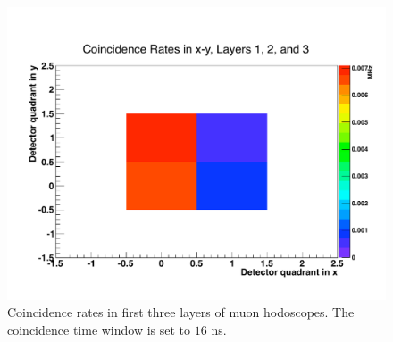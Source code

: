 \begin{figure}[htbp]
\begin{center}
\includegraphics[width=\textwidth]{performance/trigger/muon_coinrate3}
\caption{Coincidence rates in first three layers of muon hodoscopes. The coincidence time window is set to $16$ ns. }
\label{fig:c3rates}
\end{center}
\end{figure}





